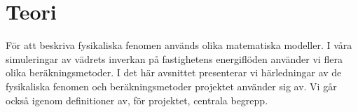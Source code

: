 \section{Teori}

För att beskriva fysikaliska fenomen används olika matematiska modeller. I våra simuleringar av vädrets inverkan på fastighetens energiflöden använder vi flera olika beräkningsmetoder. I det här avsnittet presenterar vi härledningar av de fysikaliska fenomen och beräkningsmetoder projektet använder sig av. Vi går också igenom definitioner av, för projektet, centrala begrepp.













